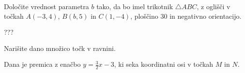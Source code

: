 \documentclass[addpoints, 12pt]{exam}
\begin{document}
\begin{questions}


    \question[5]
    Določite vrednost parametra $b$ tako, da bo imel trikotnik $\triangle ABC$, 
    z oglišči v točkah $A(-3,4)$, $B(b,5)$ in $C(1,-4)$, ploščino $30$ in negativno orientacijo.
    
    
    \begin{solution}[6cm]
        ???
    \end{solution}


    \newpage



    \question
    Narišite dano množico točk v ravnini.
    \begin{parts}
        \part[4]
        $\{-1,2,3\} \times [-1,2)$

            \begin{solution}[12cm]
                ????
            \end{solution}

        \part[4]
        $\left\{(x,y)\in\mathbb{R}^2 \mid (x<2)\land (y=x+1)\right\} $

            \begin{solution}[5.5cm]
                ????
            \end{solution}

    \end{parts}
    
    

        

\newpage
    \question
    Dana je premica z enačbo $y=\frac{3}{2}x-3$, ki seka koordinatni osi v točkah $M$ in $N$.

\end{questions}
\end{document}
